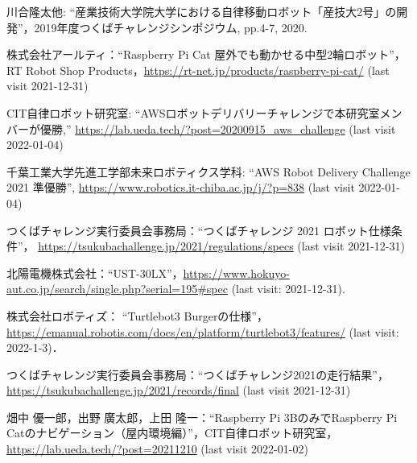 \documentclass[twocolumn,9pt]{jsproceedings}
\begin{document}
\begin{thebibliography}{99}
  川合隆太他: ``産業技術大学院大学における自律移動ロボット「産技大2号」の開発''，2019年度つくばチャレンジシンポジウム, pp.4-7, 2020.

  株式会社アールティ：``Raspberry Pi Cat 屋外でも動かせる中型2輪ロボット''，
  RT Robot Shop Products，\url{https://rt-net.jp/products/raspberry-pi-cat/} (last visit 2021-12-31)

	  CIT自律ロボット研究室: ``AWSロボットデリバリーチャレンジで本研究室メンバーが優勝,'' \url{https://lab.ueda.tech/?post=20200915_aws_challenge} (last visit 2022-01-04)

	  千葉工業大学先進工学部未来ロボティクス学科: ``AWS Robot Delivery Challenge 2021 準優勝'', \url{https://www.robotics.it-chiba.ac.jp/j/?p=838} (last visit 2022-01-04)
  
  つくばチャレンジ実行委員会事務局：``つくばチャレンジ 2021 ロボット仕様条件''，
  \url{https://tsukubachallenge.jp/2021/regulations/specs} (last visit 2021-12-31)
  
  北陽電機株式会社：``UST-30LX''，\url{https://www.hokuyo-aut.co.jp/search/single.php?serial=195#spec} (last visit: 2021-12-31).
  
  株式会社ロボティズ： ``Turtlebot3 Burgerの仕様''，\url{https://emanual.robotis.com/docs/en/platform/turtlebot3/features/} (last visit: 2022-1-3)．
  
  つくばチャレンジ実行委員会事務局：``つくばチャレンジ2021の走行結果''，
  \url{https://tsukubachallenge.jp/2021/records/final} (last visit 2021-12-31)

	  畑中 優一郎，出野 廣太郎，上田 隆一：``Raspberry Pi 3BのみでRaspberry Pi Catのナビゲーション（屋内環境編）''，CIT自律ロボット研究室，\url{https://lab.ueda.tech/?post=20211210} (last visit 2022-01-02)
\end{thebibliography}
\normalsize
\end{document}
